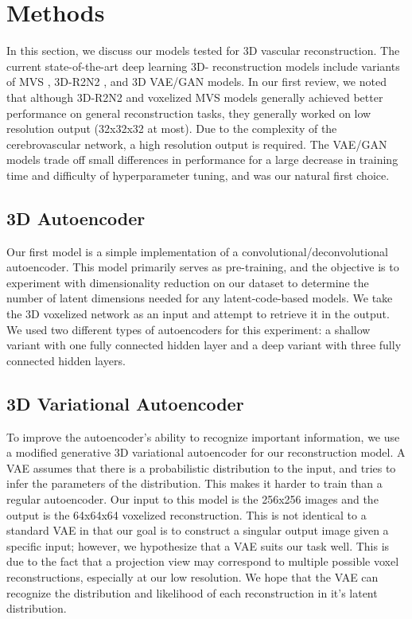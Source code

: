 \documentclass[conference, 10pt]{IEEEtran}
\begin{document}
\section{Methods}
In this section, we discuss our models tested for 3D vascular reconstruction. The current state-of-the-art deep learning 3D- reconstruction models include variants of MVS \cite{MVS}, 3D-R2N2 \cite{3DLSTM}, and 3D VAE/GAN \cite{VAE/GAN} models. In our first review, we noted that although 3D-R2N2 and voxelized MVS models generally achieved better performance on general reconstruction tasks, they generally worked on low resolution output (32x32x32 at most). Due to the complexity of the cerebrovascular network, a high resolution output is required. The VAE/GAN models trade off small differences in performance for a large decrease in training time and difficulty of hyperparameter tuning, and was our natural first choice.

\subsection{3D Autoencoder}
Our first model is a simple implementation of a convolutional/deconvolutional autoencoder. This model primarily serves as pre-training, and the objective is to experiment with dimensionality reduction on our dataset to determine the number of latent dimensions needed for any latent-code-based models. We take the 3D voxelized network as an input and attempt to retrieve it in the output. We used two different types of autoencoders for this experiment: a shallow variant with one fully connected hidden layer and a deep variant with three fully connected hidden layers. 

\subsection{3D Variational Autoencoder}
To improve the autoencoder’s ability to recognize important information, we use a modified generative 3D variational autoencoder for our reconstruction model. A VAE assumes that there is a probabilistic distribution to the input, and tries to infer the parameters of the distribution. This makes it harder to train than a regular autoencoder. Our input to this model is the 256x256 images and the output is the 64x64x64 voxelized reconstruction. This is not identical to a standard VAE in that our goal is to construct a singular output image given a specific input; however, we hypothesize that a VAE suits our task well. This is due to the fact that a projection view may correspond to multiple possible voxel reconstructions, especially at our low resolution. We hope that the VAE can recognize the distribution and likelihood of each reconstruction in it’s latent distribution.
\end{document}
